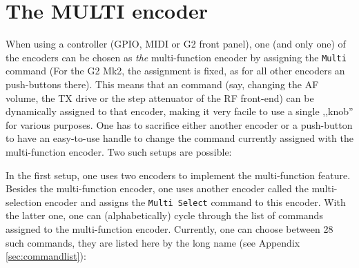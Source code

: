 \documentclass[12pt]{book}
\def\bltt#1{\texttt{\color{blue}#1}}
\begin{document}




\chapter{The MULTI encoder}
\label{sec:multiencoder}

When using a controller (GPIO, MIDI or G2 front panel), one (and only one) of the encoders can be chosen as
\textit{the} multi-function encoder by assigning the \bltt{Multi} command (For the G2 Mk2, the assignment
is fixed, as for all other encoders an push-buttons there).
This means that an command (say, changing the AF volume, the TX drive or
the step attenuator of the RF front-end) can be dynamically assigned to that encoder, making it very
facile to use a single ,,knob'' for various purposes. One has to sacrifice either another encoder
or a push-button to have an easy-to-use handle to change the command currently assigned with the
multi-function encoder. Two such setups are possible:

In the first setup, one uses two encoders to implement the multi-function feature. Besides the multi-function
encoder, one uses another encoder called the multi-selection encoder and assigns
the \bltt{Multi Select} command to this encoder. With the latter one, one can
(alphabetically) cycle
through the list of commands assigned to the multi-function encoder. Currently, one can choose between
28 such commands, they are listed here by the long name (see Appendix \ref{sec:commandlist}):
\end{document}
